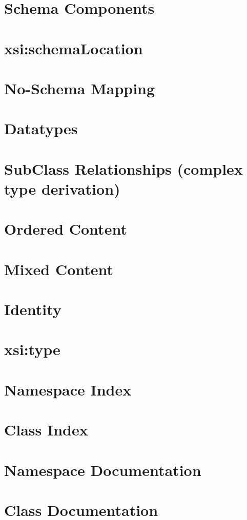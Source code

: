 \documentclass[a4paper]{article}
\begin{document}
\section{Schema Components}
\label{components}
\hypertarget{components}{}

\section{xsi:schemaLocation}
\label{schemaLocation}
\hypertarget{schemaLocation}{}

\section{No-\/Schema Mapping}
\label{noSchemaMapping}
\hypertarget{noSchemaMapping}{}

\section{Datatypes}
\label{datatypes}
\hypertarget{datatypes}{}

\section{SubClass Relationships (complex type derivation)}
\label{subclass}
\hypertarget{subclass}{}

\section{Ordered Content}
\label{order}
\hypertarget{order}{}

\section{Mixed Content}
\label{mixed}
\hypertarget{mixed}{}

\section{Identity}
\label{identity}
\hypertarget{identity}{}

\section{xsi:type}
\label{type}
\hypertarget{type}{}

\section{Namespace Index}

\section{Class Index}

\section{Namespace Documentation}


\section{Class Documentation}

\printindex
\end{document}
